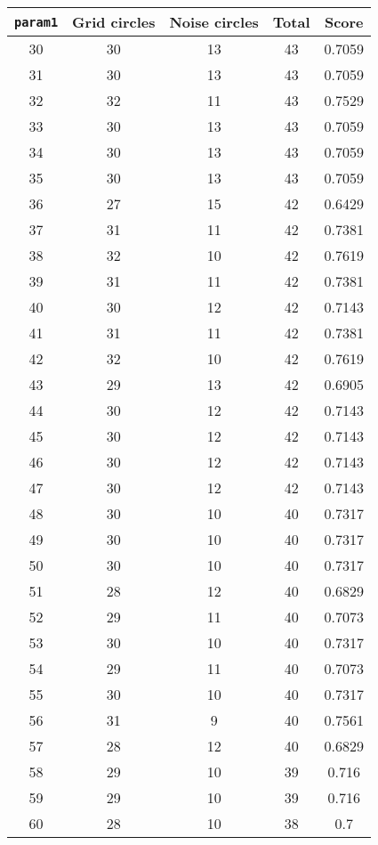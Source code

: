 \documentclass[letterpaper, 12pt]{article}
\begin{document}
\begin{longtable}{|c|c|c|c|c|}
\hline
\textbf{\texttt{param1}} & \textbf{Grid circles} & \textbf{Noise circles} & \textbf{Total} & \textbf{Score} \\
\hline
30 & 30 & 13 & 43 & 0.7059 \\
\hline
31 & 30 & 13 & 43 & 0.7059 \\
\hline
32 & 32 & 11 & 43 & 0.7529 \\
\hline
33 & 30 & 13 & 43 & 0.7059 \\
\hline
34 & 30 & 13 & 43 & 0.7059 \\
\hline
35 & 30 & 13 & 43 & 0.7059 \\
\hline
36 & 27 & 15 & 42 & 0.6429 \\
\hline
37 & 31 & 11 & 42 & 0.7381 \\
\hline
38 & 32 & 10 & 42 & 0.7619 \\
\hline
39 & 31 & 11 & 42 & 0.7381 \\
\hline
40 & 30 & 12 & 42 & 0.7143 \\
\hline
41 & 31 & 11 & 42 & 0.7381 \\
\hline
42 & 32 & 10 & 42 & 0.7619 \\
\hline
43 & 29 & 13 & 42 & 0.6905 \\
\hline
44 & 30 & 12 & 42 & 0.7143 \\
\hline
45 & 30 & 12 & 42 & 0.7143 \\
\hline
46 & 30 & 12 & 42 & 0.7143 \\
\hline
47 & 30 & 12 & 42 & 0.7143 \\
\hline
48 & 30 & 10 & 40 & 0.7317 \\
\hline
49 & 30 & 10 & 40 & 0.7317 \\
\hline
50 & 30 & 10 & 40 & 0.7317 \\
\hline
51 & 28 & 12 & 40 & 0.6829 \\
\hline
52 & 29 & 11 & 40 & 0.7073 \\
\hline
53 & 30 & 10 & 40 & 0.7317 \\
\hline
54 & 29 & 11 & 40 & 0.7073 \\
\hline
55 & 30 & 10 & 40 & 0.7317 \\
\hline
56 & 31 & 9 & 40 & 0.7561 \\
\hline
57 & 28 & 12 & 40 & 0.6829 \\
\hline
58 & 29 & 10 & 39 & 0.716 \\
\hline
59 & 29 & 10 & 39 & 0.716 \\
\hline
60 & 28 & 10 & 38 & 0.7 \\

\end{longtable}
\end{document}
